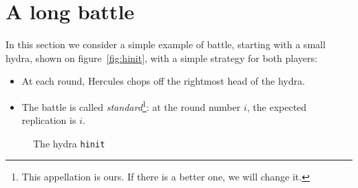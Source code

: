 
 




\section{A long battle}
\label{sect:big-battle}


In this section we consider a simple example of battle, starting with a small hydra,
shown on figure~\vref{fig:hinit}, with a simple strategy for both players:

\begin{itemize}
\item At each round, Hercules chops off the rightmost head of the hydra.
\item The battle is called \emph{standard}\footnote{This appellation is ours. If there is a better one, we will change it.}: at the round number $i$, the expected replication is $i$.
\end{itemize}



\begin{figure}[h]
  \centering

  \caption{The hydra \texttt{hinit}}
  \label{fig:hinit}
\end{figure}


